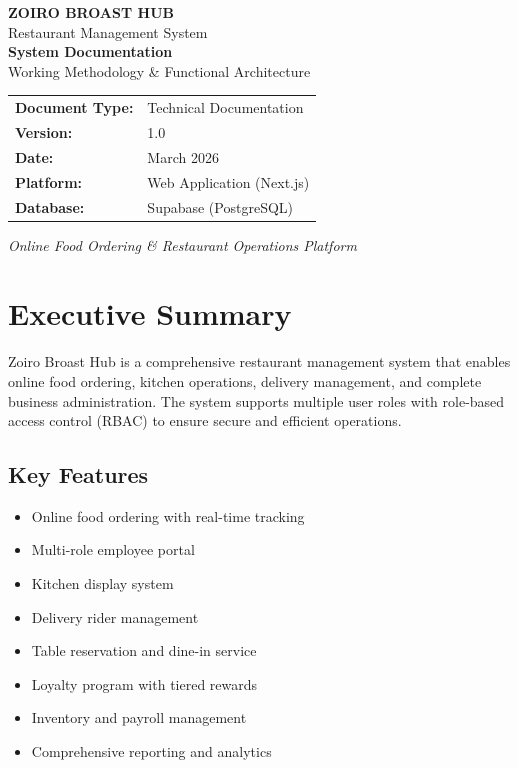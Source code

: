 \documentclass[12pt,a4paper]{article}
\begin{document}
\begin{titlepage}
    \centering
    \vspace*{2cm}
    
    {\Huge\bfseries\textcolor{primary}{ZOIRO BROAST HUB}}\\[0.5cm]
    {\Large Restaurant Management System}\\[2cm]
    
    {\LARGE\bfseries System Documentation}\\[0.5cm]
    {\large Working Methodology \& Functional Architecture}\\[3cm]
    
    \begin{tabular}{ll}
        \textbf{Document Type:} & Technical Documentation \\
        \textbf{Version:} & 1.0 \\
        \textbf{Date:} & March 2026 \\
        \textbf{Platform:} & Web Application (Next.js) \\
        \textbf{Database:} & Supabase (PostgreSQL) \\
    \end{tabular}
    
    \vfill
    
    {\large\textit{Online Food Ordering \& Restaurant Operations Platform}}
    
\end{titlepage}

\tableofcontents
\newpage

\section{Executive Summary}

Zoiro Broast Hub is a comprehensive restaurant management system that enables online food ordering, kitchen operations, delivery management, and complete business administration. The system supports multiple user roles with role-based access control (RBAC) to ensure secure and efficient operations.

\subsection{Key Features}
\begin{itemize}
    \item Online food ordering with real-time tracking
    \item Multi-role employee portal
    \item Kitchen display system
    \item Delivery rider management
    \item Table reservation and dine-in service
    \item Loyalty program with tiered rewards
    \item Inventory and payroll management
    \item Comprehensive reporting and analytics
\end{itemize}
\end{document}
